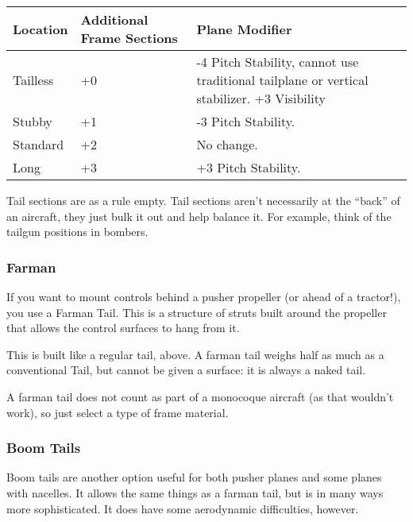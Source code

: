 \documentclass{article}
\begin{document}
\begin{tabular}{|l|l|l|}
    \hline
    Location & Additional Frame Sections & Plane Modifier                                          \\\hline
    Tailless & +0                        & -4 Pitch Stability, cannot use traditional tailplane or
    vertical stabilizer. +3 Visibility                                                             \\\hline
    Stubby   & +1                        & -3 Pitch Stability.                                     \\\hline
    Standard & +2                        & No change.                                              \\\hline
    Long     & +3                        & +3 Pitch Stability.                                     \\\hline
\end{tabular}

Tail sections are as a rule empty. Tail sections aren't
necessarily at the ``back'' of an aircraft, they just bulk it out and
help balance it. For example, think of the tailgun positions in
bombers.

\subsubsection{Farman}
\label{_Farman}

If you want to mount controls behind a pusher propeller (or ahead of a
tractor!), you use a Farman Tail. This is a structure of struts built
around the propeller that allows the control surfaces to hang from it.

This is built like a regular tail, above. A farman tail weighs half as
much as a conventional Tail, but cannot be given a surface: it is always
a naked tail.

A farman tail does not count as part of a monocoque aircraft (as that
wouldn't work), so just select a type of frame material.

\subsubsection{Boom Tails}
\label{_Boom Tails}

Boom tails are another option useful for both pusher planes and some
planes with nacelles. It allows the same things as a farman tail, but is
in many ways more sophisticated. It does have some aerodynamic
difficulties, however.
\end{document}
